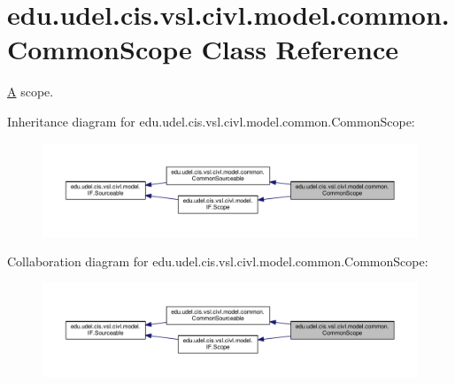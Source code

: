 \hypertarget{classedu_1_1udel_1_1cis_1_1vsl_1_1civl_1_1model_1_1common_1_1CommonScope}{}\section{edu.\+udel.\+cis.\+vsl.\+civl.\+model.\+common.\+Common\+Scope Class Reference}
\label{classedu_1_1udel_1_1cis_1_1vsl_1_1civl_1_1model_1_1common_1_1CommonScope}


\hyperlink{structA}{A} scope.  




Inheritance diagram for edu.\+udel.\+cis.\+vsl.\+civl.\+model.\+common.\+Common\+Scope\+:
\nopagebreak
\begin{figure}[H]
\begin{center}
\leavevmode
\includegraphics[width=350pt]{classedu_1_1udel_1_1cis_1_1vsl_1_1civl_1_1model_1_1common_1_1CommonScope__inherit__graph}
\end{center}
\end{figure}


Collaboration diagram for edu.\+udel.\+cis.\+vsl.\+civl.\+model.\+common.\+Common\+Scope\+:
\nopagebreak
\begin{figure}[H]
\begin{center}
\leavevmode
\includegraphics[width=350pt]{classedu_1_1udel_1_1cis_1_1vsl_1_1civl_1_1model_1_1common_1_1CommonScope__coll__graph}
\end{center}
\end{figure}
